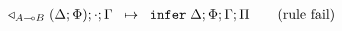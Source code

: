 \begin{align}
\triangleleft_{A \multimap B} \; (\Delta; \Phi); \cdot; \Gamma \;\; \mapsto \;\; \mathtt{infer} \; \Delta; \Phi; \Gamma; \Pi \tag{rule fail}
\end{align}
